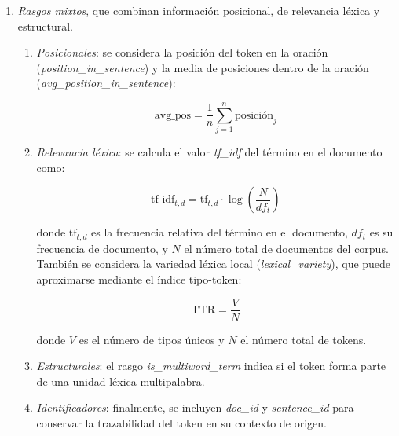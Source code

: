 \begin{enumerate}
  \item \emph{Rasgos mixtos}, que combinan información posicional, de relevancia léxica y estructural.

  \begin{enumerate}
    \item \emph{Posicionales}: se considera la posición del token en la oración (\emph{position\_in\_sentence}) y la media de posiciones dentro de la oración (\emph{avg\_position\_in\_sentence}):

    \begin{equation}
    \text{avg\_pos} = \frac{1}{n} \sum_{j=1}^{n} \text{posición}_j
    \end{equation}

    \item \emph{Relevancia léxica}: se calcula el valor \emph{tf\_idf} del término en el documento como:

    \begin{equation}
    \text{tf-idf}_{t,d} = \text{tf}_{t,d} \cdot \log\left(\frac{N}{df_t}\right)
    \end{equation}

    donde \( \text{tf}_{t,d} \) es la frecuencia relativa del término en el documento, \( df_t \) es su frecuencia de documento, y \( N \) el número total de documentos del corpus. También se considera la variedad léxica local (\emph{lexical\_variety}), que puede aproximarse mediante el índice tipo-token:

    \begin{equation}
    \text{TTR} = \frac{V}{N}
    \end{equation}

    donde \( V \) es el número de tipos únicos y \( N \) el número total de tokens.

    \item \emph{Estructurales}: el rasgo \emph{is\_multiword\_term} indica si el token forma parte de una unidad léxica multipalabra.

    \item \emph{Identificadores}: finalmente, se incluyen \emph{doc\_id} y \emph{sentence\_id} para conservar la trazabilidad del token en su contexto de origen.
  \end{enumerate}
\end{enumerate}


